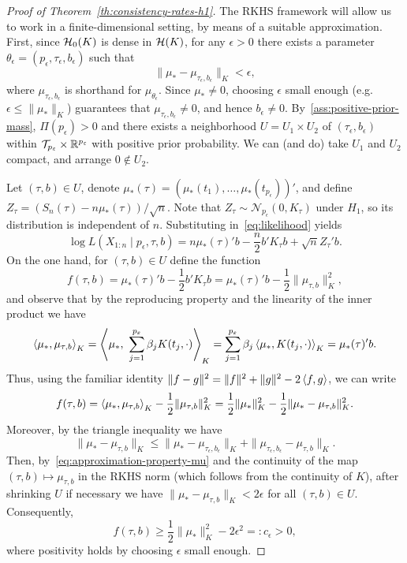 \begin{proof}[Proof of Theorem~\ref{th:consistency-rates-h1}]\label{proof:consistency-rates-h1}
The \acs{RKHS} framework will allow us to work in a finite-dimensional setting, by means of a suitable approximation. First, since \(\mathcal{H}_0(K)\) is dense in \(\mathcal{H}(K)\), for any \(\epsilon>0\) there exists a parameter \(\theta_\epsilon = (p_\epsilon, \tau_\epsilon, b_\epsilon)\) such that
\begin{equation}\label{eq:approximation-property-mu}
\|\mu_* - \mu_{\tau_\epsilon, b_\epsilon}\|_K < \epsilon,
\end{equation}
where \(\mu_{\tau_\epsilon, b_\epsilon}\) is shorthand for \(\mu_{\theta_\epsilon}\). Since \(\mu_* \neq 0\), choosing \(\epsilon\) small enough (e.g.\ \(\epsilon\leq\|\mu_*\|_K\)) guarantees that \(\mu_{\tau_\epsilon, b_\epsilon}\neq 0\), and hence \(b_\epsilon \neq 0\). By~\ref{ass:positive-prior-mass}, \(\Pi(p_\epsilon)>0\) and there exists a neighborhood \(U =U_1 \times U_2\) of \((\tau_\epsilon, b_\epsilon)\) within \(\mathcal T_{p_\varepsilon}\times \mathbb{R}^{p_\varepsilon}\) with positive prior probability. We can (and do) take \(U_1\) and \(U_2\) compact, and arrange \(0\notin U_2\). 

Let \((\tau, b)\in U\), denote \(\mu_*(\tau) = (\mu_*(t_1), \dots, \mu_*(t_{p_\epsilon}))'\), and define \(Z_\tau = (S_n(\tau) - n\mu_*(\tau))/\sqrt{n}\). Note that \(Z_\tau\sim \mathcal N_{p_\epsilon}(0, K_\tau)\) under \(H_1\), so its distribution is independent of \(n\). Substituting in~\eqref{eq:likelihood} yields
\begin{equation}\label{eq:log-likelihood-H1}
\log L(X_{1:n}\mid p_\epsilon, \tau, b) = n\mu_*(\tau)'b - \frac{n}{2}b'K_\tau b + \sqrt{n}Z_\tau'b.
\end{equation}
On the one hand, for \((\tau, b)\in U\) define the function
\[
f(\tau, b) = \mu_*(\tau)'b - \frac{1}{2}b'K_\tau b = \mu_*(\tau)'b - \frac{1}{2}\|\mu_{\tau,b}\|^2_K,
\]
and observe that by the reproducing property and the linearity of the inner product we have
\[
\left\langle\mu_*,\mu_{\tau, b}\right\rangle_K = \left\langle\mu_*,\ \sum_{j=1}^{p_\varepsilon} \beta_j K(t_j, \cdot)\right\rangle_K = \sum_{j=1}^{p_\varepsilon} \beta_j \left\langle\mu_*,K(t_j, \cdot)\right\rangle_K = \mu_*(\tau)'b.
\]
Thus, using the familiar identity \(\|f-g\|^2 = \|f\|^2 + \|g\|^2 - 2\left\langle f,g\right\rangle\), we can write
\[
f(\tau, b) = \left\langle\mu_*,\mu_{\tau, b}\right\rangle_K - \frac{1}{2}\|\mu_{\tau,b}\|^2_K = \frac{1}{2}\|\mu_*\|^2_K - \frac{1}{2}\|\mu_* - \mu_{\tau, b}\|^2_K.
\]
Moreover, by the triangle inequality we have
\[
\|\mu_* - \mu_{\tau, b}\|_K \leq \|\mu_* - \mu_{\tau_\epsilon, b_\epsilon}\|_K + \|\mu_{\tau_\epsilon, b_\epsilon} - \mu_{\tau,b}\|_K.
\]
Then, by~\eqref{eq:approximation-property-mu} and the continuity of the map \((\tau, b) \mapsto \mu_{\tau, b}\) in the \acs{RKHS} norm (which follows from the continuity of \(K\)), after shrinking \(U\) if necessary we have \(\|\mu_* - \mu_{\tau,b}\|_K < 2\epsilon\) for all \((\tau,b)\in U\). Consequently,
\[
f(\tau, b) \geq \frac{1}{2}\|\mu_*\|^2_K - 2\epsilon^2 =: c_\epsilon > 0,
\]
where positivity holds by choosing \(\epsilon\) small enough. 


\end{proof}
